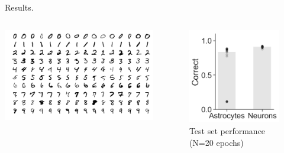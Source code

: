 \documentclass[10pt]{beamer}
\begin{document}
\begin{frame}[fragile]{Results.}
\begin{columns}
    \centering
    \includegraphics[scale=0.2]{images/minst.png} 
\begin{figure}
    \centering
    \includegraphics[scale=0.3]{images/results.png} 
    \caption{Test set performance (N=20 epochs)}
\end{figure}
\end{columns}
\end{frame}
\end{document}
